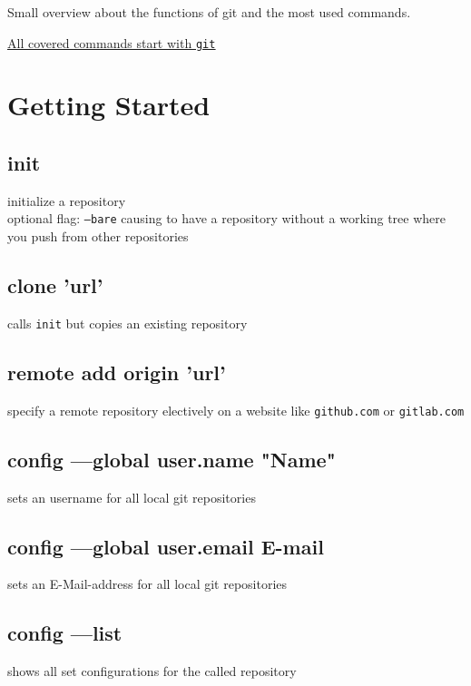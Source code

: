Small overview about the functions of git and the most used commands.
\begin{center}
	\underline{\underline{All covered commands start with \texttt{git}}}\\
\end{center}

\section*{Getting Started}


\subsection*{init} 
initialize a repository\\
optional flag: \texttt{---bare} causing to have 
a repository without a working tree where you push from other repositories \\ 

\subsection*{clone 'url'}
calls \texttt{init} but copies an existing repository\\

\subsection*{remote add origin 'url'}
specify a remote repository electively on a website like \texttt{github.com} or \texttt{gitlab.com}\\

\subsection*{config ---global user.name "Name"}
sets an username for all local git repositories\\

\subsection*{config ---global user.email E-mail}
sets an E-Mail-address for all local git repositories\\

\subsection*{config ---list}
shows all set configurations for the called repository \\


